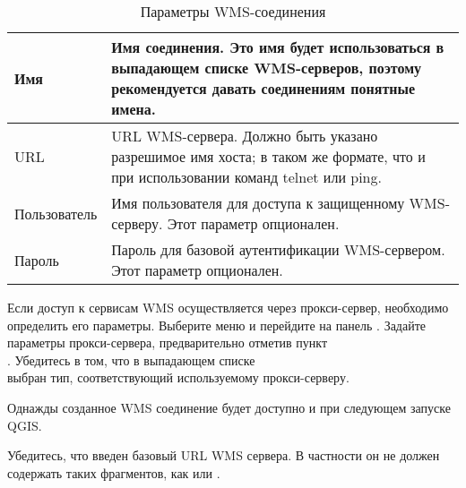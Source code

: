 \begin{table}[ht]
\centering
 \begin{tabular}{|l|p{11cm}|}
\hline Имя & Имя соединения. Это имя будет использоваться в выпадающем
списке WMS-серверов, поэтому рекомендуется давать соединениям понятные имена. \\
\hline URL \index{WMS!URL} & URL WMS-сервера.
 Должно быть указано разрешимое имя хоста; в таком же формате, что и при
 использовании команд telnet или ping. \\
\hline Пользователь \index{WMS!authentification} & Имя пользователя для доступа к
 защищенному WMS-серверу. Этот параметр опционален. \\
\hline Пароль & Пароль для базовой аутентификации WMS-сервером. Этот параметр
опционален.\\
\hline
\end{tabular}
\caption{Параметры WMS-соединения}\label{tab:wms_connection_parms}
\end{table}

Если доступ к сервисам WMS осуществляется через прокси-сервер, необходимо
определить его параметры. Выберите меню  \arrow
{} и перейдите на панель . Задайте параметры прокси-сервера, предварительно отметив пункт \\
.
Убедитесь в том, что в выпадающем списке \\
 выбран тип, соответствующий используемому прокси-серверу.

Однажды созданное WMS соединение будет доступно и при следующем запуске
QGIS.

\begin{Tip}[ht]\caption{\textsc{URL WMS серверов}}
Убедитесь, что введен базовый URL WMS сервера. В частности он не должен
содержать таких фрагментов, как  или
.
\end{Tip}

